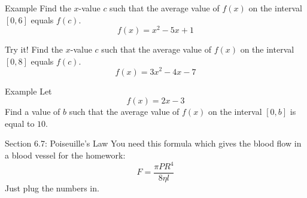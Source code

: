 \documentclass[t]{beamer}
\begin{document}
\begin{frame}{Example}
Find the $x$-value $c$ such that the average value of $f(x)$
on the interval $[0,6]$ equals $f(c)$.
$$f(x) = x^2 - 5x + 1 $$
\end{frame}

\begin{frame}{Try it!}
Find the $x$-value $c$ such that the average value of $f(x)$
on the interval $[0,8]$ equals $f(c)$.
$$f(x) = 3x^2 - 4x - 7$$
\end{frame}

\begin{frame}{Example}
Let 
$$f(x) = 2x - 3 $$
Find a value of $b$ such that the average value of $f(x)$ on the interval $[0,b]$
is equal to $10$.
\end{frame}


\begin{frame}{Section 6.7: Poiseuille's Law}
You need this formula which gives the blood flow 
in a blood vessel for the homework:
$$F = \frac{\pi P R^4}{8 \eta l}$$
Just plug the numbers in.
\end{frame}
\end{document}
